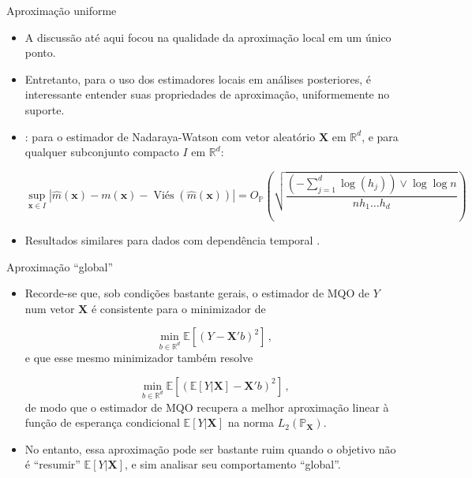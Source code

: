 \documentclass[11pt]{beamer}
\begin{document}
	\begin{frame}{Aproximação uniforme}
		\begin{itemize}
			\item A discussão até aqui focou na qualidade da aproximação local em um único ponto.
			\item Entretanto, para o uso dos estimadores locais em análises posteriores, é interessante entender suas propriedades de aproximação, {\color{blue}uniformemente no suporte}.
			\item \citet{Einmahl2005}: para o estimador de Nadaraya-Watson com vetor aleatório $\mathbf{X}$ em $\mathbb{R}^d$,  e para qualquer subconjunto compacto $I$ em $\mathbb{R}^d$:
			
			$$\sup_{\boldsymbol{x} \in I}|\hat{m}(\boldsymbol{x}) - m(\boldsymbol{x}) - \operatorname{Viés}(\hat{m}(\boldsymbol{x}))| = O_{\mathbb{P}}\left(\sqrt{\frac{ (-\sum_{j=1}^d \log(h_j)) \lor \log \log n}{{nh_1\ldots h_d}}}\right)$$ 
			\item Resultados similares para dados com dependência temporal \citep{alvarez2023maximalinequalitylocalempirical}.
		\end{itemize}
	\end{frame}
	
	\begin{frame}{Aproximação ``global''}
		\begin{itemize}
			\item Recorde-se que, sob condições bastante gerais, o estimador de MQO de $Y$ num vetor $\boldsymbol{X}$ é consistente para o minimizador de
			
			$$\min_{b \in \mathbb{R}^d} \mathbb{E}[(Y-\boldsymbol{X}'b)^2]\,, $$
			e que esse mesmo minimizador também resolve
			
			$$\min_{b \in \mathbb{R}^d} \mathbb{E}[(\mathbb{E}[Y|\boldsymbol{X}]-\boldsymbol{X}'b)^2]\,, $$
			de modo que o estimador de MQO recupera a melhor aproximação linear à função de esperança condicional $\mathbb{E}[Y|\boldsymbol{X}]$ na norma $L_2(\mathbb{P}_{\boldsymbol{X}})$.
			\item No entanto, essa aproximação pode ser bastante ruim quando o objetivo não é ``resumir'' $\mathbb{E}[Y|\mathbf{X}]$, e sim analisar seu comportamento ``global''.
		\end{itemize}
	\end{frame}
	
\end{document}
